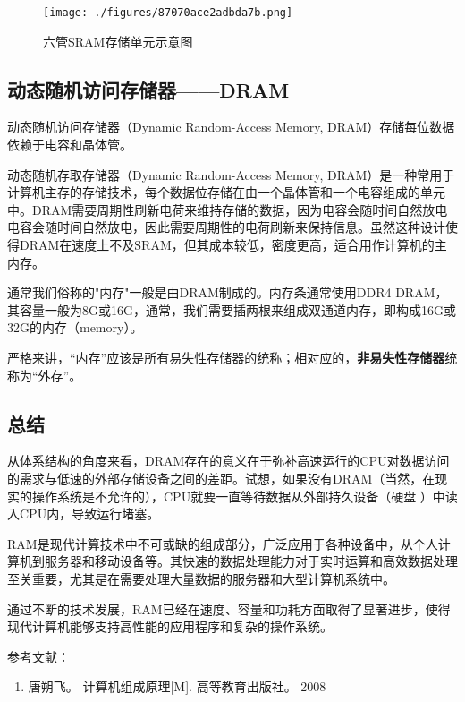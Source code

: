 \begin{figure}[ht]
\centering
\texttt{[image: ./figures/87070ace2adbda7b.png]}
\caption{六管SRAM存储单元示意图} \label{fig_RAM_3}
\end{figure}


\subsection{动态随机访问存储器——DRAM}

动态随机访问存储器（Dynamic Random-Access Memory, DRAM）存储每位数据依赖于电容和晶体管。

动态随机存取存储器（Dynamic Random-Access Memory, DRAM）是一种常用于计算机主存的存储技术，每个数据位存储在由一个晶体管和一个电容组成的单元中。DRAM需要周期性刷新电荷来维持存储的数据，因为电容会随时间自然放电电容会随时间自然放电，因此需要周期性的电荷刷新来保持信息。虽然这种设计使得DRAM在速度上不及SRAM，但其成本较低，密度更高，适合用作计算机的主内存。

通常我们俗称的"内存"一般是由DRAM制成的。内存条通常使用DDR4 DRAM，其容量一般为8G或16G，通常，我们需要插两根来组成双通道内存，即构成16G或32G的内存（memory）。

严格来讲，“内存”应该是所有易失性存储器的统称；相对应的，\textbf{非易失性存储器}统称为“外存”。


\subsection{总结}
从体系结构的角度来看，DRAM存在的意义在于弥补高速运行的CPU对数据访问的需求与低速的外部存储设备之间的差距。试想，如果没有DRAM（当然，在现实的操作系统是不允许的），CPU就要一直等待数据从外部持久设备（硬盘 ）中读入CPU内，导致运行堵塞。

RAM是现代计算技术中不可或缺的组成部分，广泛应用于各种设备中，从个人计算机到服务器和移动设备等。其快速的数据处理能力对于实时运算和高效数据处理至关重要，尤其是在需要处理大量数据的服务器和大型计算机系统中。

通过不断的技术发展，RAM已经在速度、容量和功耗方面取得了显著进步，使得现代计算机能够支持高性能的应用程序和复杂的操作系统。


参考文献：
\begin{enumerate}
\item 唐朔飞。 计算机组成原理[M]. 高等教育出版社。 2008
\end{enumerate}
